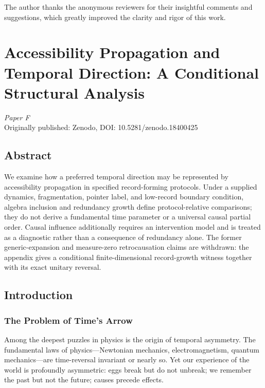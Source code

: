 \documentclass[12pt,a4paper,openany]{book}
\begin{document}
The author thanks the anonymous reviewers for their insightful comments and suggestions, which greatly improved the clarity and rigor of this work.

\chapter{Accessibility Propagation and Temporal Direction: A Conditional Structural Analysis}
\label{chap:paperF}

\begin{center}
\textit{Paper F}\\[0.5em]
Originally published: Zenodo, DOI: 10.5281/zenodo.18400425
\end{center}

\bigskip

\section*{Abstract}
We examine how a preferred temporal direction may be represented by accessibility propagation in specified record-forming protocols. Under a supplied dynamics, fragmentation, pointer label, and low-record boundary condition, algebra inclusion and redundancy growth define protocol-relative comparisons; they do not derive a fundamental time parameter or a universal causal partial order. Causal influence additionally requires an intervention model and is treated as a diagnostic rather than a consequence of redundancy alone. The former generic-expansion and measure-zero retrocausation claims are withdrawn: the appendix gives a conditional finite-dimensional record-growth witness together with its exact unitary reversal.


\section{Introduction}
\label{F-sec:intro}

\subsection{The Problem of Time's Arrow}

Among the deepest puzzles in physics is the origin of temporal asymmetry. The fundamental laws of physics---Newtonian mechanics, electromagnetism, quantum mechanics---are time-reversal invariant or nearly so. Yet our experience of the world is profoundly asymmetric: eggs break but do not unbreak; we remember the past but not the future; causes precede effects.
\end{document}
